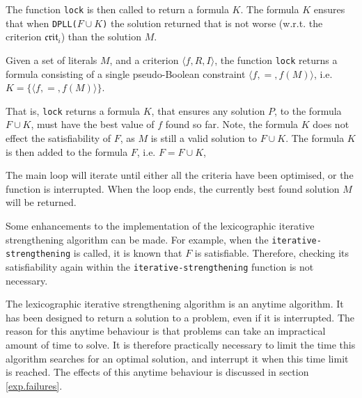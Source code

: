 The function \texttt{lock} is then called to return a formula $K$.
The formula $K$ ensures that when \texttt{DPLL(}$F \cup K$\texttt{)} the solution returned that is not worse (w.r.t. the criterion $\mathfrak{crit}_i$) than the solution $M$. 
\begin{defs}
Given a set of literals $M$, and a criterion $\langle f, R, I \rangle$,
the function \texttt{lock} returns a formula consisting of a single pseudo-Boolean constraint $\langle f,=,f(M) \rangle$, i.e. $K = \{ \langle f,=,f(M) \rangle \}$.
\end{defs}
That is, \texttt{lock} returns a formula $K$,
that ensures any solution $P$, to the formula $F \cup K$, must have the best value of $f$ found so far.
Note, the formula $K$ does not effect the satisfiability of $F$, as $M$ is still a valid solution to $F \cup K$.
The formula $K$ is then added to the formula $F$, i.e. $F = F \cup K$,

The main loop will iterate until either all the criteria have been optimised, or the function is interrupted.
When the loop ends, the currently best found solution $M$ will be returned.

Some enhancements to the implementation of the lexicographic iterative strengthening algorithm can be made.
For example, when the \texttt{iterative-strengthening} is called, it is known that $F$ is satisfiable. 
Therefore, checking its satisfiability again within the \texttt{iterative-strengthening} function is not necessary.

The lexicographic iterative strengthening algorithm is an anytime algorithm.
It has been designed to return a solution to a \modelimpl problem, even if it is interrupted.
The reason for this anytime behaviour is that \modelimpl problems can take an impractical amount of time to solve.
It is therefore practically necessary to limit the time this algorithm searches for an optimal solution, 
and interrupt it when this time limit is reached. 
The effects of this anytime behaviour is discussed in section \ref{exp.failures}.

